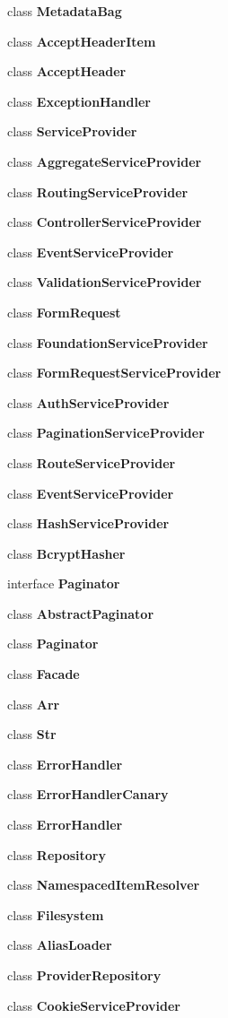 \begin{DoxyCompactItemize}
class {\bf Metadata\+Bag}
\item 
class {\bf Accept\+Header\+Item}
\item 
class {\bf Accept\+Header}
\item 
class {\bf Exception\+Handler}
\item 
class {\bf Service\+Provider}
\item 
class {\bf Aggregate\+Service\+Provider}
\item 
class {\bf Routing\+Service\+Provider}
\item 
class {\bf Controller\+Service\+Provider}
\item 
class {\bf Event\+Service\+Provider}
\item 
class {\bf Validation\+Service\+Provider}
\item 
class {\bf Form\+Request}
\item 
class {\bf Foundation\+Service\+Provider}
\item 
class {\bf Form\+Request\+Service\+Provider}
\item 
class {\bf Auth\+Service\+Provider}
\item 
class {\bf Pagination\+Service\+Provider}
\item 
class {\bf Route\+Service\+Provider}
\item 
class {\bf Event\+Service\+Provider}
\item 
class {\bf Hash\+Service\+Provider}
\item 
class {\bf Bcrypt\+Hasher}
\item 
interface {\bf Paginator}
\item 
class {\bf Abstract\+Paginator}
\item 
class {\bf Paginator}
\item 
class {\bf Facade}
\item 
class {\bf Arr}
\item 
class {\bf Str}
\item 
class {\bf Error\+Handler}
\item 
class {\bf Error\+Handler\+Canary}
\item 
class {\bf Error\+Handler}
\item 
class {\bf Repository}
\item 
class {\bf Namespaced\+Item\+Resolver}
\item 
class {\bf Filesystem}
\item 
class {\bf Alias\+Loader}
\item 
class {\bf Provider\+Repository}
\item 
class {\bf Cookie\+Service\+Provider}

\end{DoxyCompactItemize}
